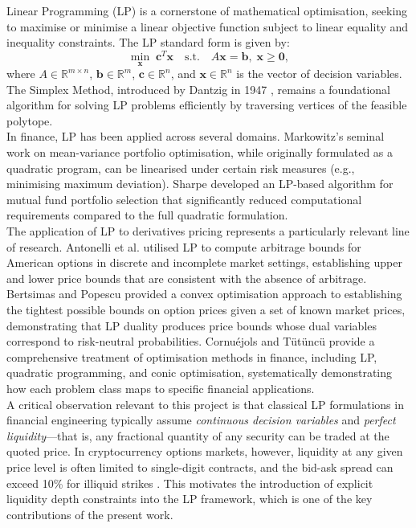 \documentclass[openany]{book}
\numberwithin{figure}{chapter}
\numberwithin{equation}{chapter}
\begin{document}
Linear Programming (LP) is a cornerstone of mathematical optimisation, seeking to maximise or minimise a linear objective function subject to linear equality and inequality constraints. The LP standard form is given by:
$$\min_{\mathbf{x}} \; \mathbf{c}^T\mathbf{x} \quad \text{s.t.} \quad A\mathbf{x} = \mathbf{b}, \; \mathbf{x} \geq \mathbf{0},$$
where $A \in \mathbb{R}^{m \times n}$, $\mathbf{b} \in \mathbb{R}^m$, $\mathbf{c} \in \mathbb{R}^n$, and $\mathbf{x} \in \mathbb{R}^n$ is the vector of decision variables. The Simplex Method, introduced by Dantzig in 1947 \cite{dantzig1947}, remains a foundational algorithm for solving LP problems efficiently by traversing vertices of the feasible polytope.\\

In finance, LP has been applied across several domains. Markowitz's \cite{markowitz1952} seminal work on mean-variance portfolio optimisation, while originally formulated as a quadratic program, can be linearised under certain risk measures (e.g., minimising maximum deviation). Sharpe \cite{sharpe1967} developed an LP-based algorithm for mutual fund portfolio selection that significantly reduced computational requirements compared to the full quadratic formulation.\\

The application of LP to derivatives pricing represents a particularly relevant line of research. Antonelli et al. \cite{antonelli1999} utilised LP to compute arbitrage bounds for American options in discrete and incomplete market settings, establishing upper and lower price bounds that are consistent with the absence of arbitrage. Bertsimas and Popescu \cite{bertsimas2002} provided a convex optimisation approach to establishing the tightest possible bounds on option prices given a set of known market prices, demonstrating that LP duality produces price bounds whose dual variables correspond to risk-neutral probabilities. Cornu\'{e}jols and T\"{u}t\"{u}nc\"{u} \cite{cornuejols2006} provide a comprehensive treatment of optimisation methods in finance, including LP, quadratic programming, and conic optimisation, systematically demonstrating how each problem class maps to specific financial applications.\\

A critical observation relevant to this project is that classical LP formulations in financial engineering typically assume \textit{continuous decision variables} and \textit{perfect liquidity}---that is, any fractional quantity of any security can be traded at the quoted price. In cryptocurrency options markets, however, liquidity at any given price level is often limited to single-digit contracts, and the bid-ask spread can exceed 10\% for illiquid strikes \cite{goyenko2009}. This motivates the introduction of explicit liquidity depth constraints into the LP framework, which is one of the key contributions of the present work.
\end{document}
